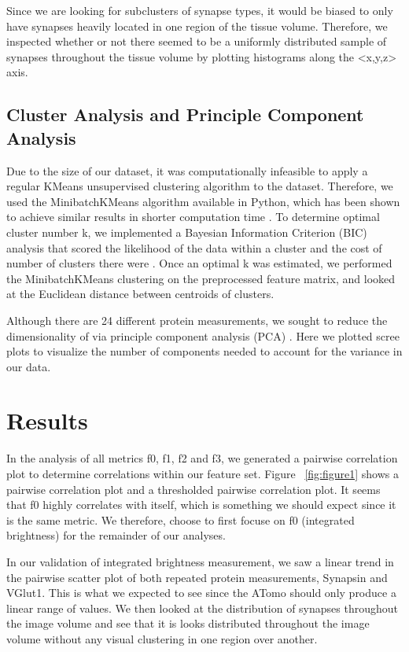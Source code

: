 \documentclass{article}
\begin{document}
Since we are looking for subclusters of synapse types, it would be biased to only have synapses heavily located in one region of the tissue volume. Therefore, we inspected whether or not there seemed to be a uniformly distributed sample of synapses throughout the tissue volume by plotting histograms along the <x,y,z> axis.

\subsection{Cluster Analysis and Principle Component Analysis}
Due to the size of our dataset, it was computationally infeasible to apply a regular KMeans unsupervised clustering algorithm to the dataset. Therefore, we used the MinibatchKMeans algorithm available in Python, which has been shown to achieve similar results in shorter computation time \cite{Sculley2010}. To determine optimal cluster number k, we implemented a Bayesian Information Criterion (BIC) analysis that scored the likelihood of the data within a cluster and the cost of number of clusters there were \cite{Fallis2013}. Once an optimal k was estimated, we performed the MinibatchKMeans clustering on the preprocessed feature matrix, and looked at the Euclidean distance between centroids of clusters. 

Although there are 24 different protein measurements, we sought to reduce the dimensionality of via principle component analysis (PCA) \cite{Wold1987}. Here we plotted scree plots to visualize the number of components needed to account for the variance in our data. 

\section{Results}
\label{results}

In the analysis of all metrics f0, f1, f2 and f3, we generated a pairwise correlation plot to determine correlations within our feature set. Figure ~\ref{fig:figure1} shows a pairwise correlation plot and a thresholded pairwise correlation plot. It seems that f0 highly correlates with itself, which is something we should expect since it is the same metric. We therefore, choose to first focuse on f0 (integrated brightness) for the remainder of our analyses. 

In our validation of integrated brightness measurement, we saw a linear trend in the pairwise scatter plot of both repeated protein measurements, Synapsin and VGlut1. This is what we expected to see since the ATomo should only produce a linear range of values. We then looked at the distribution of synapses throughout the image volume and see that it is looks distributed throughout the image volume without any visual clustering in one region over another.
\end{document}
